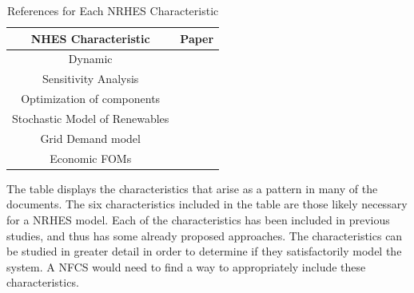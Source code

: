 \documentclass[12pt]{UIdahoMastersThesis}
\begin{document}
\begin{table}[h!]
\centering
\caption{References for Each NRHES Characteristic}
\begin{tabular}{ ||c | c|| }
 \hline 
 NHES Characteristic & Paper \\ [0.5ex]
 \hline \hline
 Dynamic & \cite{Garcia2013, Du2014, Kazimi, Garcia2016}\\
 \hline
 Sensitivity Analysis & \cite{Shropshire2011, Rehman2010, Adaramola2014, Chen2016}\\
 \hline
 Optimization of components & \cite{Chen2016,Ozcan2016, Forsberg2009,Garcia2015,Aumeier2011}\\
 \hline
 Stochastic Model of Renewables & \cite{Rabiti2015, Garcia2016,Locatelli2015}\\ 
 \hline
 Grid Demand model & \cite{Forsberg2013, Garcia2016,Garcia2013,Ruth2014,Chen2016}\\
 \hline
  Economic FOMs & \cite{Garcia2016,Chen2016,Rabiti2015,Epiney2016,Bragg-Sitton2014}\\
 \hline
\end{tabular}
\label{table:1}
\end{table}

The table displays the characteristics that arise as a pattern in many of the documents.  The six characteristics included in the table are those likely necessary for a NRHES model.  Each of the characteristics has been included in previous studies, and thus has some already proposed approaches.  The characteristics can be studied in greater detail in order to determine if they satisfactorily model the system. A NFCS would need to find a way to appropriately include these characteristics.
\end{document}
